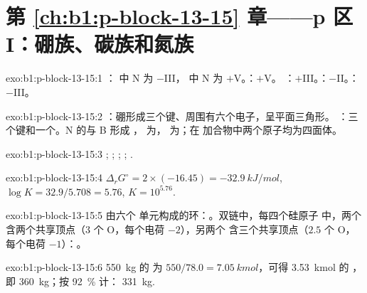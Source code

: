 \section*{第 \ref{ch:b1:p-block-13-15} 章——p 区 I：硼族、碳族和氮族}

\begin{solution}{exo:b1:p-block-13-15:1}
： 中 N 为 $-$III， 中 N 为 $+$V。：$+$V。
：$+$III。：$-$II。：$-$III。
\end{solution}

\begin{solution}{exo:b1:p-block-13-15:2}
：硼形成三个键、周围有六个电子，呈平面三角形。
：三个键和一个。N 的与 B 形成
， 为， 为；在
加合物中两个原子均为四面体。
\end{solution}

\begin{solution}{exo:b1:p-block-13-15:3}
; ;
; ;
.
\end{solution}

\begin{solution}{exo:b1:p-block-13-15:4}
$\Delta_r G^\circ = 2 \times (-16.45) = \qty{-32.9}{kJ/mol}$, $\log K =
32.9/5.708 = 5.76$, $K = 10^{5.76}$.
\end{solution}

\begin{solution}{exo:b1:p-block-13-15:5}
由六个  单元构成的环：。双链中，每四个硅原子
中，两个含两个共享顶点（3 个 O，每个电荷 $-2$），另两个
含三个共享顶点（$2.5$ 个 O，每个电荷 $-1$）：。
\end{solution}

\begin{solution}{exo:b1:p-block-13-15:6}
\qty{550}{kg} 的  为 $550/78.0 = \qty{7.05}{kmol}$，可得
\qty{3.53}{kmol} 的 ，即 \qty{360}{kg}；按 \qty{92}{\percent} 计：
\qty{331}{kg}.
\end{solution}

